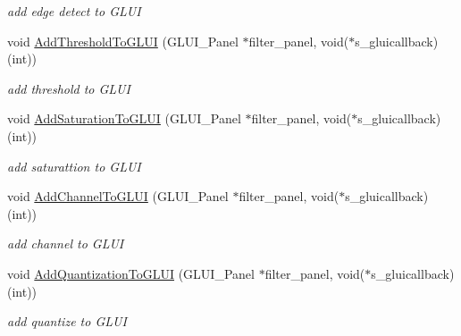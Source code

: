 \begin{DoxyCompactItemize}
\begin{DoxyCompactList}\small\item\em add edge detect to G\+L\+UI \end{DoxyCompactList}\item 
void \hyperlink{classimage__tools_1_1FilterManager_a7886a22bba28b6a4d47e4da8dcf6e500}{Add\+Threshold\+To\+G\+L\+UI} (G\+L\+U\+I\+\_\+\+Panel $\ast$filter\+\_\+panel, void($\ast$s\+\_\+gluicallback)(int))\hypertarget{classimage__tools_1_1FilterManager_a7886a22bba28b6a4d47e4da8dcf6e500}{}\label{classimage__tools_1_1FilterManager_a7886a22bba28b6a4d47e4da8dcf6e500}

\begin{DoxyCompactList}\small\item\em add threshold to G\+L\+UI \end{DoxyCompactList}\item 
void \hyperlink{classimage__tools_1_1FilterManager_a7d6d4cefdcf8cf23ae5467ed220d8ffe}{Add\+Saturation\+To\+G\+L\+UI} (G\+L\+U\+I\+\_\+\+Panel $\ast$filter\+\_\+panel, void($\ast$s\+\_\+gluicallback)(int))\hypertarget{classimage__tools_1_1FilterManager_a7d6d4cefdcf8cf23ae5467ed220d8ffe}{}\label{classimage__tools_1_1FilterManager_a7d6d4cefdcf8cf23ae5467ed220d8ffe}

\begin{DoxyCompactList}\small\item\em add saturattion to G\+L\+UI \end{DoxyCompactList}\item 
void \hyperlink{classimage__tools_1_1FilterManager_afe7ab6a2f6de62dc1b3b4c1d4350ddbe}{Add\+Channel\+To\+G\+L\+UI} (G\+L\+U\+I\+\_\+\+Panel $\ast$filter\+\_\+panel, void($\ast$s\+\_\+gluicallback)(int))\hypertarget{classimage__tools_1_1FilterManager_afe7ab6a2f6de62dc1b3b4c1d4350ddbe}{}\label{classimage__tools_1_1FilterManager_afe7ab6a2f6de62dc1b3b4c1d4350ddbe}

\begin{DoxyCompactList}\small\item\em add channel to G\+L\+UI \end{DoxyCompactList}\item 
void \hyperlink{classimage__tools_1_1FilterManager_ae13d0c9858da16b283bdf71ee2b4ad8f}{Add\+Quantization\+To\+G\+L\+UI} (G\+L\+U\+I\+\_\+\+Panel $\ast$filter\+\_\+panel, void($\ast$s\+\_\+gluicallback)(int))\hypertarget{classimage__tools_1_1FilterManager_ae13d0c9858da16b283bdf71ee2b4ad8f}{}\label{classimage__tools_1_1FilterManager_ae13d0c9858da16b283bdf71ee2b4ad8f}

\begin{DoxyCompactList}\small\item\em add quantize to G\+L\+UI \end{DoxyCompactList}\end{DoxyCompactItemize}
